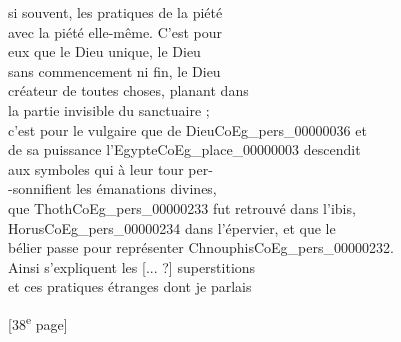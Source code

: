 \documentclass{book}
\begin{document}
{\begin{paracol}{2}
si souvent, les pratiques de la piété\\
avec la piété elle-même. C’est pour\\
eux que le Dieu unique, le Dieu\\
sans commencement ni fin, le Dieu\\
créateur de toutes choses, planant dans\\
la partie invisible du sanctuaire ;\\
c’est pour le vulgaire que de Dieu\gls{CoEg_pers_00000036} et\\
de sa puissance l’Egypte\gls{CoEg_place_00000003} descendit\\
aux symboles qui à leur tour per-\\
-sonnifient les émanations divines,\\
que Thoth\gls{CoEg_pers_00000233} fut retrouvé dans l’ibis,\\
Horus\gls{CoEg_pers_00000234} dans l’épervier, et que le\\
bélier passe pour représenter Chnouphis\gls{CoEg_pers_00000232}.\\
Ainsi s’expliquent les [... ?] superstitions\\
et ces pratiques étranges dont je parlais
\end{paracol}

{\footnotesize\begin{center} {[38\textsuperscript{e} page]}\end{center}}

}
\end{document}
